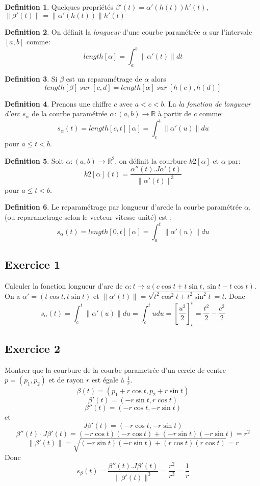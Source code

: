 \documentclass[]{book}
\theoremstyle{definition}
\newtheorem{defn}{Definition}
\newcommand{\bb}[1]{\mathbb{#1}}
\newcommand{\R}{\bb{R}}
\begin{document}
 
\begin{defn}
Quelques propri\'et\'es $\beta'(t) = \alpha'(h(t))h'(t)$, $\lVert \beta'(t)\rVert = \lVert\alpha'(h(t))\rVert h'(t)$
\end{defn}
 

\begin{defn}
On d\'efinit la \emph{longueur} d'une courbe param\'etr\'ee $\alpha$ sur l'intervale $[a,b]$ comme:
$$length[\alpha] = \int_a^b \lVert \alpha'(t)\rVert dt$$
\end{defn}

\begin{defn}
Si $\beta$ est un reparam\'etrage de $\alpha$ alors
$$length[\beta] \ sur\ [c,d] = length[\alpha]  \ sur\ [h(c),h(d)]$$ 
\end{defn}
 

\begin{defn}
Prenons une chiffre $c$ avec $a < c < b$. La \emph{la fonction de longueur d'arc} $s_{\alpha}$ de la courbe param\'etr\'ee $\alpha:(a,b) \to \R$ \`a partir de $c$ comme:
$$
s_{\alpha}(t) = length[c,t][\alpha] = \int_c^t \lVert \alpha'(u) \rVert du
$$ 
pour $a \le t < b$.
\end{defn}
 
\begin{defn}
Soit $\alpha: (a,b) \to \R^2$, on d\'efinit la courbure $k2[\alpha]$ et $\alpha$ par:
$$
k2[\alpha](t) = \frac{\alpha''(t).J\alpha'(t)}{\lVert \alpha'(t) \rVert^3}
$$ 
pour $a \le t < b$.
\end{defn}


\begin{defn}
Le reparam\'etrage par longueur d'arcde la courbe param\'etr\'ee $\alpha$, (ou reparametrage selon le vecteur vitesse unit\'e) est :
$$
s_{\alpha}(t) = length[0,t][\alpha] = \int_0^t \lVert \alpha'(u) \rVert du
$$ 
\end{defn}

\subsection*{Exercice 1}
Calculer la fonction longueur d'arc de $\alpha: t \to a(c\cos t + t\sin t, \sin t - t\cos t)$.
On a $\alpha' = (t \cos t, t \sin t)$ et $\lVert \alpha'(t) \rVert = \sqrt{t^2 \cos^2 t + t^2 \sin^2 t} = t$.
Donc
$$
s_{\alpha}(t) = \int_c^t \lVert \alpha'(u) \rVert du = \int_c^t{u du} = \left[ \frac{u^2}{2} \right]_c^t = \frac{t^2}{2} - \frac{c^2}{2}
$$ 

\subsection*{Exercice 2}
Montrer que la courbure de la courbe parametr\'ee d'un cercle de centre $p = (p_1, p_2)$ et de rayon $r$ est \'egale \`a $\frac{1}{r}$.
$$\beta(t) = (p_1 + r\cos t, p_2 + r\sin t)$$
$$\beta'(t) = (-r\sin t, r\cos t)$$
$$\beta''(t) = (-r\cos t, -r\sin t)$$
et
$$J\beta'(t) = (-r\cos t, -r\sin t)$$
$$\beta''(t) \cdot J\beta'(t) = (-r \cos t)(-r \cos t) + (-r \sin t)(-r \sin t) = r^2$$
$$\lVert \beta'(t) \rVert = \sqrt{(-r \sin t)(-r \sin t) + (r \cos t)(r \cos t)} = r$$
Donc
$$
s_{\beta}(t) = \frac{\beta''(t).J\beta'(t)}{\lVert \beta'(t) \rVert^3} = \frac{r^2}{r^3} = \frac{1}{r}
$$ 
\end{document}
